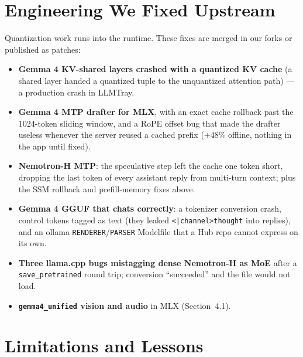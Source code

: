 \documentclass[10pt,letterpaper]{article}
\begin{document}
\section{Engineering We Fixed Upstream}

Quantization work runs into the runtime. These fixes are merged in our forks or published as patches:
\begin{itemize}
  \item \textbf{Gemma 4 KV-shared layers crashed with a quantized KV cache} (a shared layer handed a quantized tuple to the unquantized attention path) --- a production crash in LLMTray.
  \item \textbf{Gemma 4 MTP drafter for MLX}, with an exact cache rollback past the 1024-token sliding window, and a RoPE offset bug that made the drafter useless whenever the server reused a cached prefix (+48\% offline, nothing in the app until fixed).
  \item \textbf{Nemotron-H MTP}: the speculative step left the cache one token short, dropping the last token of every assistant reply from multi-turn context; plus the SSM rollback and prefill-memory fixes above.
  \item \textbf{Gemma 4 GGUF that chats correctly}: a tokenizer conversion crash, control tokens tagged as text (they leaked \texttt{<|channel>thought} into replies), and an ollama \texttt{RENDERER}/\texttt{PARSER} Modelfile that a Hub repo cannot express on its own.
  \item \textbf{Three llama.cpp bugs mistagging dense Nemotron-H as MoE} after a \texttt{save\_pretrained} round trip; conversion ``succeeded'' and the file would not load.
  \item \textbf{\texttt{gemma4\_unified} vision and audio} in MLX (Section~4.1).
\end{itemize}

\enlargethispage{3\baselineskip}
\section{Limitations and Lessons}
\end{document}
